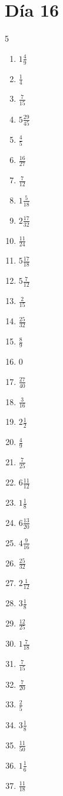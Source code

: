 \documentclass[12pt]{article}
\begin{document}
\section*{Día 16}
\begin{multicols}{5}\begin{enumerate}
\item $ 1 \frac{4}{9} $
\item $ \frac{1}{4} $
\item $ \frac{7}{15} $
\item $ 5 \frac{29}{45} $
\item $ \frac{4}{5} $
\item $ \frac{16}{27} $
\item $ \frac{7}{12} $
\item $ 1 \frac{5}{18} $
\item $ 2 \frac{17}{32} $
\item $ \frac{11}{24} $
\item $ 5 \frac{17}{18} $
\item $ 5 \frac{7}{12} $
\item $ \frac{2}{15} $
\item $ \frac{25}{32} $
\item $ \frac{8}{9} $
\item $ 0 $
\item $ \frac{27}{40} $
\item $ \frac{3}{16} $
\item $ 2 \frac{1}{2} $
\item $ \frac{4}{9} $
\item $ \frac{7}{25} $
\item $ 6 \frac{11}{12} $
\item $ 1 \frac{1}{8} $
\item $ 6 \frac{13}{20} $
\item $ 4 \frac{9}{16} $
\item $ \frac{25}{32} $
\item $ 2 \frac{1}{12} $
\item $ 3 \frac{1}{8} $
\item $ \frac{12}{25} $
\item $ 1 \frac{7}{18} $
\item $ \frac{7}{15} $
\item $ \frac{7}{20} $
\item $ \frac{2}{5} $
\item $ 3 \frac{1}{8} $
\item $ \frac{11}{50} $
\item $ 1 \frac{1}{6} $
\item $ \frac{11}{18} $

\end{enumerate}
\end{multicols}
\end{document}
